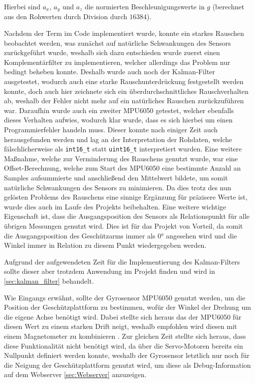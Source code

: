 Hierbei sind $a_x$, $a_y$ und $a_z$ die normierten Beschleunigungswerte in $\mathit{g}$ (berechnet aus den Rohwerten durch Division durch $16384$). 

Nachdem der Term im Code implementiert wurde, konnte ein starkes Rauschen beobachtet werden, was zunächst auf natürliche Schwankungen des Sensors zurückgeführt wurde, weshalb sich dazu entschieden wurde zuerst einen Komplementärfilter zu implementieren,
welcher allerdings das Problem nur bedingt beheben konnte. Deshalb wurde auch noch der Kalman-Filter ausgetestet, wodurch auch eine starke  Rauschunterdrückung festgestellt werden konnte, doch auch hier zeichnete sich ein überdurchschnittliches Rauschverhalten ab, weshalb der Fehler nicht mehr auf ein natürliches Rauschen zurückzuführen war.
Daraufhin wurde auch ein zweiter MPU6050 getestet, welcher ebenfalls dieses Verhalten aufwies, wodurch klar wurde, dass es sich hierbei um einen Programmierfehler handeln muss. Dieser konnte nach einiger Zeit auch herausgefunden werden und lag an der Interpretation der Rohdaten, 
welche fälschlicherweise als \texttt{int16\_t} statt \texttt{uint16\_t} interpretiert wurden. Eine weitere Maßnahme, welche zur Verminderung des Rauschens genutzt wurde, war eine Offset-Berechnung, welche zum Start des MPU6050 eine bestimmte Anzahl an Samples aufsummierte und anschließend den Mittelwert bildete, um somit natürliche Schwankungen des Sensors zu minimieren.
Da dies trotz des nun gelösten Problems des Rauschens eine sinnige Ergänzung für präzisere Werte ist, wurde dies auch im Laufe des Projekts beibehalten. Eine weitere wichtige Eigenschaft ist, dass die Ausgangsposition des Sensors als Relationspunkt für alle übrigen Messungen genutzt wird.
Dies ist für das Projekt von Vorteil, da somit die Ausgangsposition des Geschützarms immer als 0° angesehen wird und die Winkel immer in Relation zu diesem Punkt wiedergegeben werden.

Aufgrund der aufgewendeten Zeit für die Implementierung des Kalman-Filters sollte dieser aber trotzdem Anwendung im Projekt finden und wird in \ref{sec:kalman_filter} behandelt.

Wie Eingangs erwähnt, sollte der Gyrosensor MPU6050 genutzt werden, um die Position der Geschützplattform zu bestimmen, wofür der Winkel der Drehung um die eigene Achse benötigt wird. Dabei stellte sich heraus das der MPU6050 für diesen Wert zu einem starken Drift neigt, weshalb empfohlen wird diesen mit einem Magnetometer zu kombinieren \cite[S. 26]{raspberry_invensense_mpu6050_datasheet}.
Zur gleichen Zeit stellte sich heraus, dass diese Funktionalität nicht benötigt wird, da über die Servo-Motoren bereits ein Nullpunkt definiert werden konnte, weshalb der Gyrosensor letztlich nur noch für die Neigung der Geschützplattform genutzt wird, um diese als Debug-Information auf dem Webserver \ref{sec:Webserver} anzuzeigen.


